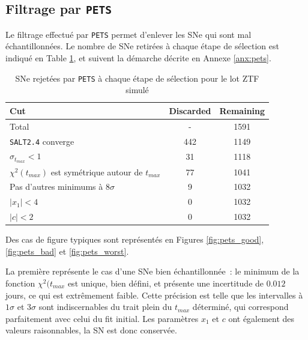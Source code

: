 \documentclass{book}
\def\pets{\texttt{PETS}\xspace}
\def\saltd{\texttt{SALT2.4}\xspace}
\begin{document}
\subsection{Filtrage par \pets}

Le filtrage effectué par \pets permet d'enlever les SNe qui sont mal échantillonnées. Le nombre de SNe retirées à chaque étape de sélection est indiqué en Table \ref{tab:pets}, et suivent la démarche décrite en Annexe \ref{anx:pets}.

\begin{table}
    \centering
    \begin{tabular}{p{7cm}|c|c}
         Cut & Discarded & Remaining\\
         \hline
         Total & - & 1591\\
         \saltd converge & 442 & 1149\\
         $\sigma_{t_{max}}<1$ & 31 & 1118\\
         $\chi^2(t_{max})$ est symétrique autour de $t_{max}$ & 77 & 1041\\
         Pas d'autres minimums à $8\sigma$ & 9 & 1032\\
	$|x_1|<4$ & 0 & 1032\\
	$|c|<2$ & 0  & 1032
    \end{tabular}
    \caption{SNe rejetées par \pets à chaque étape de sélection pour le lot ZTF simulé}
    \label{tab:pets}
\end{table}

 Des cas de figure typiques sont représentés en Figures \ref{fig:pets_good}, \ref{fig:pets_bad} et \ref{fig:pets_worst}.
 
La première représente le cas d'une SNe bien échantillonnée~: le minimum de la fonction $\chi^2(t_{max}$ est unique, bien défini, et présente une incertitude de $0.012$ jours, ce qui est extrêmement faible. Cette précision est telle que les intervalles à $1\sigma$ et $3\sigma$ sont indiscernables du trait plein du $t_{max}$ déterminé, qui correspond parfaitement avec celui du fit initial. Les paramètres $x_1$ et $c$ ont également des valeurs raisonnables, la SN est donc conservée.
\end{document}
